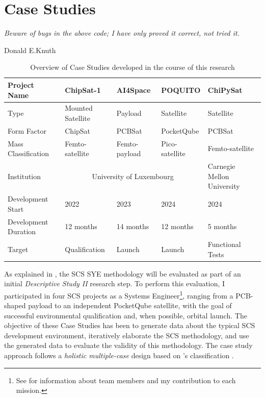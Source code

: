 \documentclass[a4paper,nobib,justified,final]{tufte-book}
\begin{document}
\chapter{Case Studies}
\label{chap:CASESTUDIES}

\begin{fullwidth}
\epigraph{\emph{%
		Beware of bugs in the above code; I have only proved it correct, not tried it.}}{Donald E.\@ Knuth}
\end{fullwidth}

\begin{table}[h]
	\caption{Overview of Case Studies developed in the course of this research}
	\label{tab:c_case_studies}
	\begin{tabular}{@{}lllll@{}}
		\toprule
		Project Name & ChipSat-1 & AI4Space & POQUITO & ChiPySat \\ \midrule
		Type & Mounted Satellite & Payload & Satellite & Satellite \\
		Form Factor & ChipSat & PCBSat & PocketQube & PCBSat \\
		Mass Classification & Femto-satellite & Femto-payload & Pico-satellite & Femto-satellite \\ \midrule
		Institution & \multicolumn{3}{c}{University of Luxembourg} & Carnegie Mellon University \\
		Development Start & 2022 & 2023 & 2024 & 2024 \\
		Development Duration & 12 months & 14 months & 12 months & 5 months \\
		Target & Qualification & Launch & Launch & Functional Tests \\ \bottomrule
	\end{tabular}
	\vspace{2ex}
\end{table}

As explained in , the \acf{SCS} \acl{SYE} methodology will be evaluated as part of an initial \emph{Descriptive Study II} research step. To perform this evaluation, I participated in four \acs{SCS} projects as a Systems Engineer\footnote{See  for information about team members and my contribution to each mission.}, ranging from a \acs{PCB}-shaped payload to an independent PocketQube satellite, with the goal of successful environmental qualification and, when possible, orbital launch. The objective of these Case Studies has been to generate data about the typical \acs{SCS} development environment, iteratively elaborate the \acs{SCS} methodology, and use the generated data to evaluate the validity of this methodology. The case study approach follows a \emph{holistic multiple-case} design based on \citeauthor{yinCaseStudyResearch2014}'s classification \autocite{yinCaseStudyResearch2014}.
\end{document}
